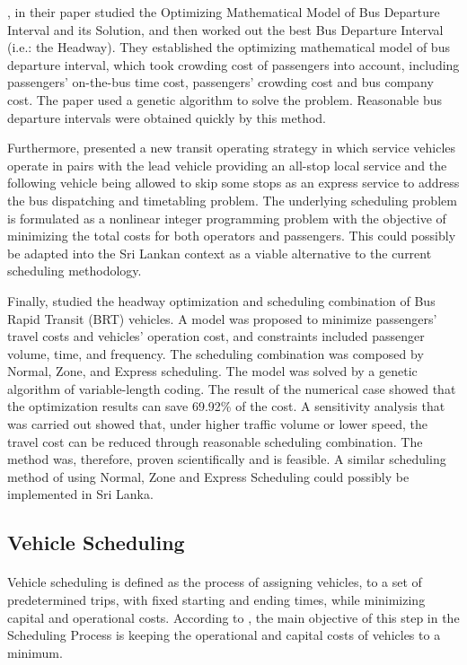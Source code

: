 \documentclass[12pt, oneside]{report}
\begin{document}
\citet{Qian2013}, in their paper studied the Optimizing Mathematical Model of Bus Departure Interval and its Solution, and then worked out the best Bus Departure Interval (i.e.: the Headway). They established the optimizing mathematical model of bus departure interval, which took crowding cost of passengers into account, including passengers’ on-the-bus time cost, passengers’ crowding cost and bus company cost. The paper used a genetic algorithm to solve the problem. Reasonable bus departure intervals were obtained quickly by this method.

Furthermore, \citet{Fu2003} presented a new transit operating strategy in which service vehicles operate in pairs with the lead vehicle providing an all-stop local service and the following vehicle being allowed to skip some stops as an express service to address the bus dispatching and timetabling problem. The underlying scheduling problem is formulated as a nonlinear integer programming problem with the objective of minimizing the total costs for both operators and passengers. This could possibly be adapted into the Sri Lankan context as a viable alternative to the current scheduling methodology.

Finally, \citet{Sun2008} studied the headway optimization and scheduling combination of Bus Rapid Transit (BRT) vehicles. A model was proposed to minimize passengers' travel costs and vehicles' operation cost, and constraints included passenger volume, time, and frequency. The scheduling combination was composed by Normal, Zone, and Express scheduling. The model was solved by a genetic algorithm of variable-length coding. The result of the numerical case showed that the optimization results can save 69.92\% of the cost. A sensitivity analysis that was carried out showed that, under higher traffic volume or lower speed, the travel cost can be reduced through reasonable scheduling combination. The method was, therefore, proven scientifically and is feasible. A similar scheduling method of using Normal, Zone and Express Scheduling could possibly be implemented in Sri Lanka.

\subsection{Vehicle Scheduling}

\paragraph{ } Vehicle scheduling is defined as the process of assigning vehicles, to a set of predetermined trips, with fixed starting and ending times, while minimizing capital and operational costs. According to \citet{Freling2003}, the main objective of this step in the Scheduling Process is keeping the operational and capital costs of vehicles to a minimum.
\end{document}
